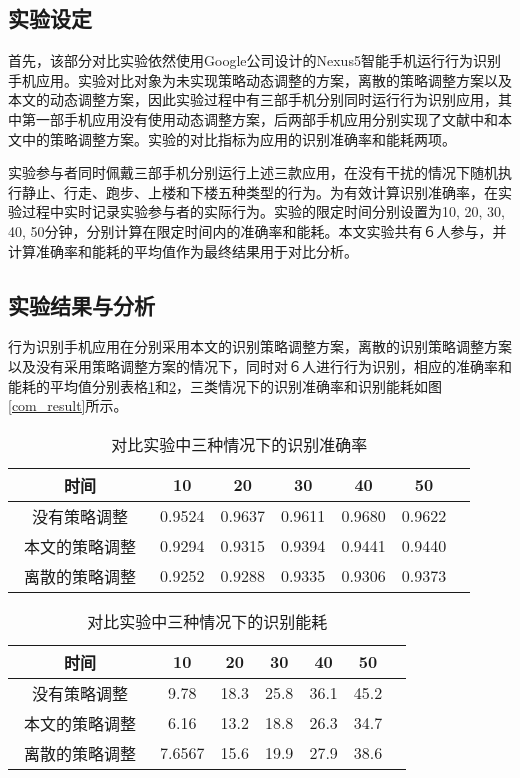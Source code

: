 \subsection{实验设定}
\par 首先，该部分对比实验依然使用Google公司设计的Nexus5智能手机运行行为识别手机应用。实验对比对象为未实现策略动态调整的方案，离散的策略调整方案以及本文的动态调整方案，因此实验过程中有三部手机分别同时运行行为识别应用，其中第一部手机应用没有使用动态调整方案，后两部手机应用分别实现了文献\cite{modelVarialb}中和本文中的策略调整方案。实验的对比指标为应用的识别准确率和能耗两项。
\par 实验参与者同时佩戴三部手机分别运行上述三款应用，在没有干扰的情况下随机执行静止、行走、跑步、上楼和下楼五种类型的行为。为有效计算识别准确率，在实验过程中实时记录实验参与者的实际行为。实验的限定时间分别设置为10, 20, 30, 40, 50分钟，分别计算在限定时间内的准确率和能耗。本文实验共有６人参与，并计算准确率和能耗的平均值作为最终结果用于对比分析。
\subsection{实验结果与分析}
\par 行为识别手机应用在分别采用本文的识别策略调整方案，离散的识别策略调整方案以及没有采用策略调整方案的情况下，同时对６人进行行为识别，相应的准确率和能耗的平均值分别表格\ref{final_precision}和\ref{final_energy}，三类情况下的识别准确率和识别能耗如图\ref{com_result}所示。

\begin{table}[htb]
    \centering
    \caption{对比实验中三种情况下的识别准确率}\label{final_precision}
    \begin{tabular}{ccccccc}
    \toprule
    时间 & 10 & 20 & 30 & 40 & 50 \\
    \midrule
    没有策略调整 & 0.9524 & 0.9637 & 0.9611 & 0.9680 & 0.9622 \\
    本文的策略调整　& 0.9294 & 0.9315 & 0.9394 & 0.9441 & 0.9440 \\
    离散的策略调整 & 0.9252 & 0.9288 & 0.9335 & 0.9306 & 0.9373 \\
    \bottomrule
    \end{tabular}
\end{table}

\begin{table}[htb]
    \centering
    \caption{对比实验中三种情况下的识别能耗}\label{final_energy}
    \begin{tabular}{ccccccc}
    \toprule
    时间 & 10 & 20 & 30 & 40 & 50 \\
    \midrule
    没有策略调整 & 9.78 & 18.3 & 25.8 & 36.1 & 45.2 \\
    本文的策略调整　& 6.16 & 13.2 & 18.8 & 26.3 & 34.7 \\
    离散的策略调整 & 7.6567 & 15.6 & 19.9 & 27.9 & 38.6 \\
    \bottomrule
    \end{tabular}
\end{table}

